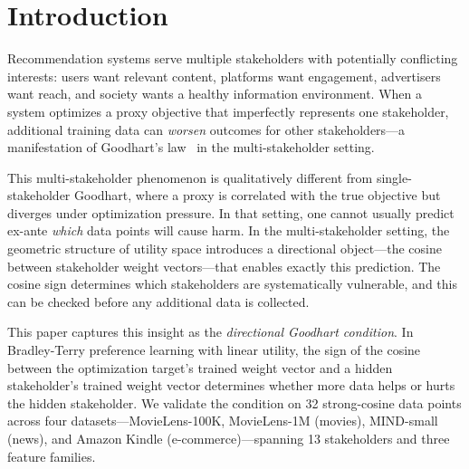 \documentclass[11pt,letterpaper]{article}
\begin{document}
\section{Introduction}
\label{sec:intro}

Recommendation systems serve multiple stakeholders with potentially
conflicting interests: users want relevant content, platforms want
engagement, advertisers want reach, and society wants a healthy
information environment. When a system optimizes a proxy objective
that imperfectly represents one stakeholder, additional training data
can \emph{worsen} outcomes for other stakeholders---a manifestation of
Goodhart's law~\cite{casper2023open} in the multi-stakeholder setting.

This multi-stakeholder phenomenon is qualitatively different from
single-stakeholder Goodhart, where a proxy is correlated with the
true objective but diverges under optimization pressure. In that
setting, one cannot usually predict ex-ante \emph{which} data points
will cause harm. In the multi-stakeholder setting, the geometric
structure of utility space introduces a directional object---the
cosine between stakeholder weight vectors---that enables exactly this
prediction. The cosine sign determines which stakeholders are
systematically vulnerable, and this can be checked before any
additional data is collected.

This paper captures this insight as the \emph{directional Goodhart
condition}. In Bradley-Terry preference learning with linear utility,
the sign of the cosine between the optimization target's trained
weight vector and a hidden stakeholder's trained weight vector
determines whether more data helps or hurts the hidden stakeholder.
We validate the condition on 32 strong-cosine data points across four
datasets---MovieLens-100K, MovieLens-1M (movies), MIND-small (news),
and Amazon Kindle (e-commerce)---spanning 13 stakeholders and three
feature families.
\end{document}
